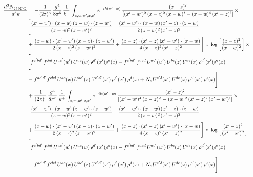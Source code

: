 \documentclass[9pt]{article}
\numberwithin{equation}{section}
\begin{document}
\begin{align}
    \frac{d^{3}N_{2b\,\rm NLO}^{\rm}}{d^{3}k}  & = - \frac{1}{(2\pi)^{3}}\, \frac{g^{4}}{8\pi^{5}}\,\frac{1}{k^{+}}\,\int_{z,w,w^{\prime},x,x'}\, e^{-ik(w^{\prime}-w)}\, \frac{(x-z)^{2}}{\left[(x'-w')^{2}\,(x-z)^{2}\,(x-w)^{2} - (x-w)^{4}\, (x'-z)^{2}\right]}\,  \times\notag \\ & \Bigg[\frac{(x'-w')\cdot (x-w)\, (z-w)\cdot (z-w')}{(z-w)^{2}\, (z-w')^{2}}+\frac{(x'-w')\cdot (x-w)\, (x'-z)\cdot (z-w)}{2\, (z-w)^{2}\, (x'-z)^{2}}\notag \\ & +\frac{(x-w)\cdot (x'-w')\, (x-z)\cdot (z-w')}{2\, (x-z)^{2}\, (z-w')^{2}}+\frac{(x-z)\cdot (x'-z)\, (x'-w')\cdot (x-w)}{4\, (x-z)^{2}\, (x'-z)^{2}}\Bigg] \times\,\log{\left[\frac{(x-z)^{2}}{(x-w)^{2}}\right]}\,\times \notag \\ & \Bigg[f^{c'bd'}\,f^{cbd}\, U^{ac'}(w')\,U^{ac}(w)\,\rho^{d'}(x')\rho^{d}(x)- f^{c'bd'}\,f^{acd}\,U^{ac'}(w')\,U^{bc}(z)\,U^{de}(x)\,\rho^{d'}(x')\rho^{e}(x) \notag \\ & -f^{ac'd'}\,f^{cbd}\,U^{ac}(w)\,U^{bc'}(z)\,U^{e'd'}(x')\,\rho^{e'}(x')\,\rho^{d}(x) +N_{c}\,U^{e'd}(x')\,U^{de}(x)\,\rho^{e'}(x')\,\rho^{e}(x)\Bigg] \notag \\
&  + \frac{1}{(2\pi)^{3}}\, \frac{g^{4}}{8\pi^{5}}\,\frac{1}{k^{+}}\,\int_{z,w,w^{\prime},x,x'}\, e^{-ik(w^{\prime}-w)}\, \frac{(x'-z)^{2}}{\left[(x'-w')^{4}\,(x-z)^{2}\, - (x-w)^{2}\, (x'-z)^{2}\,(x'-w')^{2}\right]}\,  \times\notag \\ & \Bigg[\frac{(x'-w')\cdot (x-w)\, (z-w)\cdot (z-w')}{(z-w)^{2}\, (z-w')^{2}}+\frac{(x'-w')\cdot (x-w)\, (x'-z)\cdot (z-w)}{2\, (z-w)^{2}\, (x'-z)^{2}}\notag \\ & +\frac{(x-w)\cdot (x'-w')\, (x-z)\cdot (z-w')}{2\, (x-z)^{2}\, (z-w')^{2}}+\frac{(x-z)\cdot (x'-z)\, (x'-w')\cdot (x-w)}{4\, (x-z)^{2}\, (x'-z)^{2}}\Bigg] \times\,\log{\left[\frac{(x'-z)^{2}}{(x'-w')^{2}}\right]} \notag \\ & \Bigg[f^{c'bd'}\,f^{cbd}\, U^{ac'}(w')\,U^{ac}(w)\,\rho^{d'}(x')\rho^{d}(x)- f^{c'bd'}\,f^{acd}\,U^{ac'}(w')\,U^{bc}(z)\,U^{de}(x)\,\rho^{d'}(x')\rho^{e}(x) \notag \\ & -f^{ac'd'}\,f^{cbd}\,U^{ac}(w)\,U^{bc'}(z)\,U^{e'd'}(x')\,\rho^{e'}(x')\,\rho^{d}(x) +N_{c}\,U^{e'd}(x')\,U^{de}(x)\,\rho^{e'}(x')\,\rho^{e}(x)\Bigg]
\end{align}
\end{document}
